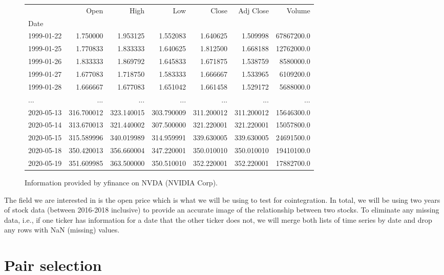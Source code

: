 \documentclass{UoYCSproject}
\begin{document}
\begin{figure}[h]
\begin{center}
\begin{adjustbox}{max width=\textwidth}
\begin{tabular}{lrrrrrr} & Open & High & Low & Close & Adj Close & Volume\\Date & & & & & &\\1999-01-22 & 1.750000 & 1.953125 & 1.552083 & 1.640625 &  1.509998 & 67867200.0 \\1999-01-25 & 1.770833 & 1.833333 & 1.640625 & 1.812500 &  1.668188 & 12762000.0 \\1999-01-26 & 1.833333 & 1.869792 & 1.645833 & 1.671875 &  1.538759 &  8580000.0 \\1999-01-27 & 1.677083 & 1.718750 & 1.583333 & 1.666667 &  1.533965 &  6109200.0 \\1999-01-28 & 1.666667 & 1.677083 & 1.651042 & 1.661458 &  1.529172 &  5688000.0\\... & ... & ... & ... & ... & ... & ...\\2020-05-13 & 316.700012 & 323.140015 & 303.790009 & 311.200012 & 311.200012 & 15646300.0\\2020-05-14 & 313.670013 & 321.440002 & 307.500000 & 321.220001 & 321.220001 & 15057800.0 \\2020-05-15 & 315.589996 & 340.019989 & 314.959991 & 339.630005 & 339.630005 & 24691500.0 \\2020-05-18 & 350.420013 & 356.660004 & 347.220001 & 350.010010 & 350.010010 & 19410100.0 \\2020-05-19 & 351.609985 & 363.500000 & 350.510010 & 352.220001 & 352.220001 & 17882700.0\\
\end{tabular}
\end{adjustbox}
\end{center}
\caption{Information provided by yfinance on NVDA (NVIDIA Corp).}
\end{figure}

The field we are interested in is the open price which is what we will be using to test for cointegration. In total, we will be using two years of stock data (between 2016-2018 inclusive) to provide an accurate image of the relationship between two stocks. To eliminate any missing data, i.e., if one ticker has information for a date that the other ticker does not, we will merge both lists of time series by date and drop any rows with NaN (missing) values.

\section{Pair selection}
\end{document}
